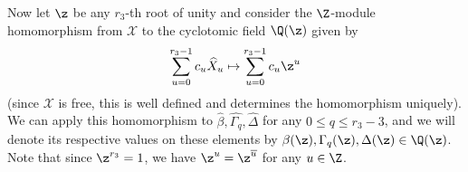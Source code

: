 Now let $\z$ be any $r_3$-th root of unity and consider the $\Z$-module homomorphism from $\mathcal{X}$ to the cyclotomic field $\Q(\z)$ given by $$\sum_{u=0}^{r_3-1}c_u \widehat{X}_u\mapsto \sum_{u=0}^{r_3-1}c_u \z^u$$ 
(since $\mathcal{X}$ is free, this is well defined and determines the homomorphism uniquely).
We can apply this homomorphism to $\widehat{\beta},\widehat{\Gamma_q},\widehat{\Delta}$ for any $0\le q \le r_3-3$, and we will denote its respective values on these elements by $\beta(\z),\Gamma_q(\z),\Delta(\z)\in\Q(\z)$. Note that since $\z^{r_3}=1$, we have $\z^u=\z^{\overline{u}}$ for any $u\in\Z$.


